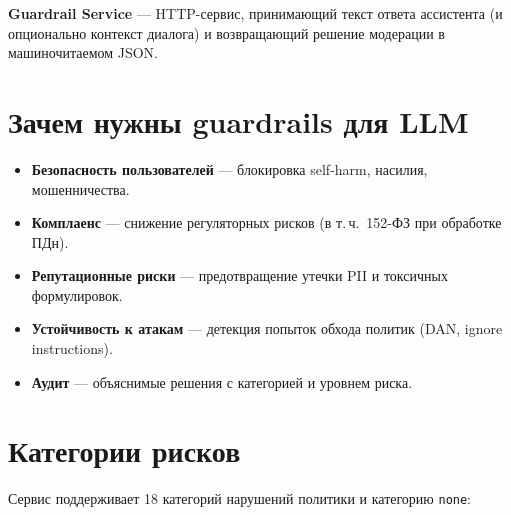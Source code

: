 \documentclass[12pt,a4paper]{report}
\begin{document}
\textbf{Guardrail Service} --- HTTP-сервис, принимающий текст ответа ассистента
(и опционально контекст диалога) и возвращающий решение модерации в машиночитаемом JSON.

\section{Зачем нужны guardrails для LLM}

\begin{itemize}[noitemsep]
    \item \textbf{Безопасность пользователей} --- блокировка self-harm, насилия, мошенничества.
    \item \textbf{Комплаенс} --- снижение регуляторных рисков (в т.\,ч.\ 152-ФЗ при обработке ПДн).
    \item \textbf{Репутационные риски} --- предотвращение утечки PII и токсичных формулировок.
    \item \textbf{Устойчивость к атакам} --- детекция попыток обхода политик (DAN, ignore instructions).
    \item \textbf{Аудит} --- объяснимые решения с категорией и уровнем риска.
\end{itemize}

\section{Категории рисков}

Сервис поддерживает 18 категорий нарушений политики и категорию \texttt{none}:
\end{document}
